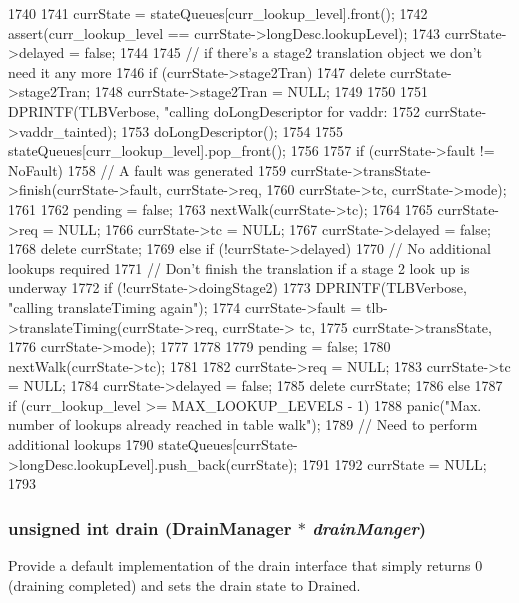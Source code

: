 \begin{DoxyCode}
1740 {
1741     currState = stateQueues[curr_lookup_level].front();
1742     assert(curr_lookup_level == currState->longDesc.lookupLevel);
1743     currState->delayed = false;
1744 
1745     // if there's a stage2 translation object we don't need it any more
1746     if (currState->stage2Tran) {
1747         delete currState->stage2Tran;
1748         currState->stage2Tran = NULL;
1749     }
1750 
1751     DPRINTF(TLBVerbose, "calling doLongDescriptor for vaddr:%
1752             currState->vaddr_tainted);
1753     doLongDescriptor();
1754 
1755     stateQueues[curr_lookup_level].pop_front();
1756 
1757     if (currState->fault != NoFault) {
1758         // A fault was generated
1759         currState->transState->finish(currState->fault, currState->req,
1760                                       currState->tc, currState->mode);
1761 
1762         pending = false;
1763         nextWalk(currState->tc);
1764 
1765         currState->req = NULL;
1766         currState->tc = NULL;
1767         currState->delayed = false;
1768         delete currState;
1769     } else if (!currState->delayed) {
1770         // No additional lookups required
1771         // Don't finish the translation if a stage 2 look up is underway
1772         if (!currState->doingStage2) {
1773             DPRINTF(TLBVerbose, "calling translateTiming again\n");
1774             currState->fault = tlb->translateTiming(currState->req, currState->
      tc,
1775                                                     currState->transState,
1776                                                     currState->mode);
1777         }
1778 
1779         pending = false;
1780         nextWalk(currState->tc);
1781 
1782         currState->req = NULL;
1783         currState->tc = NULL;
1784         currState->delayed = false;
1785         delete currState;
1786     } else {
1787         if (curr_lookup_level >= MAX_LOOKUP_LEVELS - 1)
1788             panic("Max. number of lookups already reached in table walk\n");
1789         // Need to perform additional lookups
1790         stateQueues[currState->longDesc.lookupLevel].push_back(currState);
1791     }
1792     currState = NULL;
1793 }
\end{DoxyCode}
\hypertarget{classArmISA_1_1TableWalker_aa8a18d230dba7a674ac8a0b4f35bc36a}{
\subsubsection[{drain}]{\setlength{\rightskip}{0pt plus 5cm}unsigned int drain ({\bf DrainManager} $\ast$ {\em drainManger})}}
\label{classArmISA_1_1TableWalker_aa8a18d230dba7a674ac8a0b4f35bc36a}
Provide a default implementation of the drain interface that simply returns 0 (draining completed) and sets the drain state to Drained. 

